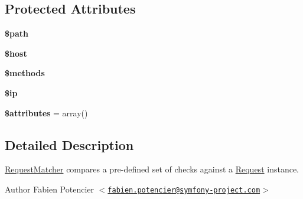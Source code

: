 \subsection*{\-Protected \-Attributes}
\begin{DoxyCompactItemize}
\item 
\hypertarget{class_symfony_1_1_component_1_1_http_foundation_1_1_request_matcher_a0a4baf0b22973c07685c3981f0d17fc4}{
{\bfseries \$path}}
\label{class_symfony_1_1_component_1_1_http_foundation_1_1_request_matcher_a0a4baf0b22973c07685c3981f0d17fc4}

\item 
\hypertarget{class_symfony_1_1_component_1_1_http_foundation_1_1_request_matcher_a711797613cb863ca0756df789c396bf2}{
{\bfseries \$host}}
\label{class_symfony_1_1_component_1_1_http_foundation_1_1_request_matcher_a711797613cb863ca0756df789c396bf2}

\item 
\hypertarget{class_symfony_1_1_component_1_1_http_foundation_1_1_request_matcher_a802753499268a04da139bd6e6ef89b35}{
{\bfseries \$methods}}
\label{class_symfony_1_1_component_1_1_http_foundation_1_1_request_matcher_a802753499268a04da139bd6e6ef89b35}

\item 
\hypertarget{class_symfony_1_1_component_1_1_http_foundation_1_1_request_matcher_a9a08c84edd46f257c94cdf8d443cc77d}{
{\bfseries \$ip}}
\label{class_symfony_1_1_component_1_1_http_foundation_1_1_request_matcher_a9a08c84edd46f257c94cdf8d443cc77d}

\item 
\hypertarget{class_symfony_1_1_component_1_1_http_foundation_1_1_request_matcher_adc851f7a62250e75df0490c0280aef4c}{
{\bfseries \$attributes} = array()}
\label{class_symfony_1_1_component_1_1_http_foundation_1_1_request_matcher_adc851f7a62250e75df0490c0280aef4c}

\end{DoxyCompactItemize}


\subsection{\-Detailed \-Description}
\hyperlink{class_symfony_1_1_component_1_1_http_foundation_1_1_request_matcher}{\-Request\-Matcher} compares a pre-\/defined set of checks against a \hyperlink{class_symfony_1_1_component_1_1_http_foundation_1_1_request}{\-Request} instance.

\begin{DoxyAuthor}{\-Author}
\-Fabien \-Potencier $<$\href{mailto:fabien.potencier@symfony-project.com}{\tt fabien.\-potencier@symfony-\/project.\-com}$>$ 
\end{DoxyAuthor}


